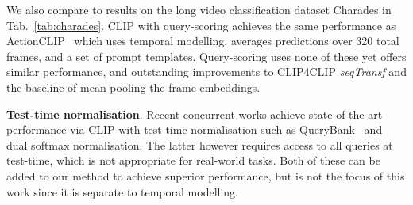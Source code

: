 We also compare to results on the long video classification dataset Charades in Tab.~\ref{tab:charades}. CLIP with query-scoring achieves the same performance as ActionCLIP~\cite{wang2021actionclip} which uses temporal modelling, averages predictions over 320 total frames, and a set of prompt templates. Query-scoring uses none of these yet offers similar performance, and outstanding improvements to CLIP4CLIP \textit{seqTransf} and the baseline of mean pooling the frame embeddings.

\noindent\textbf{Test-time normalisation}. Recent concurrent works achieve state of the art performance via CLIP with test-time normalisation such as QueryBank~\cite{cheng2021improving,bogolin2022cross} and dual softmax normalisation. The latter however requires access to all queries at test-time, which is not appropriate for real-world tasks. Both of these can be added to our method to achieve superior performance, but is not the focus of this work since it is separate to temporal modelling.


